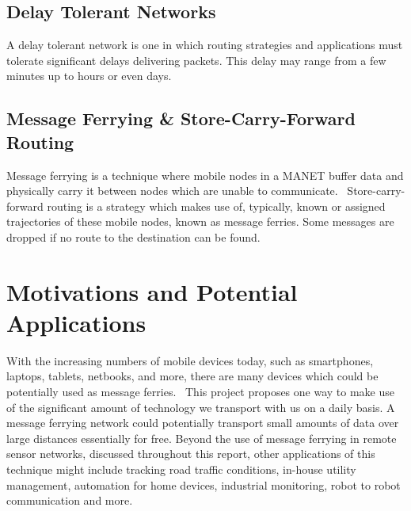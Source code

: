 \subsection{Delay Tolerant Networks}
\label{sec:delay_loss_tolerant}
A delay tolerant network is one in which routing strategies and applications must tolerate significant delays delivering packets.
This delay may range from a few minutes up to hours or even days.~\cite{Routing}


\subsection{Message Ferrying \& Store-Carry-Forward Routing}
\label{sec:ferrying_overview}
Message ferrying is a technique where mobile nodes in a MANET buffer data and physically carry it between nodes which are unable to communicate.~\cite{adhocmsgferry}
Store-carry-forward routing is a strategy which makes use of, typically, known or assigned trajectories of these mobile nodes, known as message ferries.
Some messages are dropped if no route to the destination can be found.  



\section{Motivations and Potential Applications}
\label{sec:motivations}

With the increasing numbers of mobile devices today, such as smartphones, laptops, tablets, netbooks, and more, there are many devices which could be potentially used as message ferries.~\cite{wearable} 
This project proposes one way to make use of the significant amount of technology we transport with us on a daily basis.
A message ferrying network could potentially transport small amounts of data over large distances essentially for free.
Beyond the use of message ferrying in remote sensor networks, discussed throughout this report, other applications of this technique might include tracking road traffic conditions, in-house utility management, automation for home devices, industrial monitoring, robot to robot communication and more.~\cite{book1}


